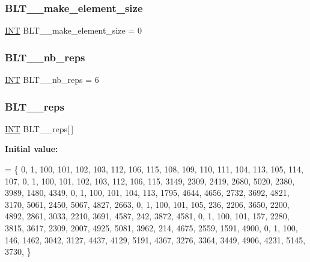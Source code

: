 \subsubsection{\texorpdfstring{B\+L\+T\+\_\+\_\+make\+\_\+element\+\_\+size}{BLT\_17\_make\_element\_size}}
{\footnotesize\ttfamily \mbox{\hyperlink{galois_8h_a09fddde158a3a20bd2dcadb609de11dc}{I\+NT}} B\+L\+T\+\_\+\_\+make\+\_\+element\+\_\+size = 0}

\mbox{\label{data___b_l_t_8_c_ab325b80e1e431a23f3cba09487884aac}} 
\subsubsection{\texorpdfstring{B\+L\+T\+\_\+\_\+nb\+\_\+reps}{BLT\_17\_nb\_reps}}
{\footnotesize\ttfamily \mbox{\hyperlink{galois_8h_a09fddde158a3a20bd2dcadb609de11dc}{I\+NT}} B\+L\+T\+\_\+\_\+nb\+\_\+reps = 6}

\mbox{\label{data___b_l_t_8_c_af823967c0c17812175cbe2bd8d6fdc6b}} 
\subsubsection{\texorpdfstring{B\+L\+T\+\_\+\_\+reps}{BLT\_17\_reps}}
{\footnotesize\ttfamily \mbox{\hyperlink{galois_8h_a09fddde158a3a20bd2dcadb609de11dc}{I\+NT}} B\+L\+T\+\_\+\_\+reps\mbox{[}$\,$\mbox{]}}

{\bfseries Initial value\+:}
\begin{DoxyCode}
= \{
    0, 1, 100, 101, 102, 103, 112, 106, 115, 108, 109, 110, 111, 104, 113, 105, 114, 107, 
    0, 1, 100, 101, 102, 103, 112, 106, 115, 3149, 2309, 2419, 2680, 5020, 2380, 3989, 1480, 4349, 
    0, 1, 100, 101, 104, 113, 1795, 4644, 4656, 2732, 3692, 4821, 3170, 5061, 2450, 5067, 4827, 2663, 
    0, 1, 100, 101, 105, 236, 2206, 3650, 2200, 4892, 2861, 3033, 2210, 3691, 4587, 242, 3872, 4581, 
    0, 1, 100, 101, 157, 2280, 3815, 3617, 2309, 2007, 4925, 5081, 3962, 214, 4675, 2559, 1591, 4900, 
    0, 1, 100, 146, 1462, 3042, 3127, 4437, 4129, 5191, 4367, 3276, 3364, 3449, 4906, 4231, 5145, 3730, 
\}
\end{DoxyCode}
\mbox{\label{data___b_l_t_8_c_af527f090acf2d90c858fa942e6155a0b}} 
